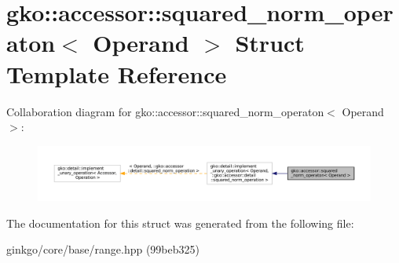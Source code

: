 \hypertarget{structgko_1_1accessor_1_1squared__norm__operaton}{}\section{gko\+:\+:accessor\+:\+:squared\+\_\+norm\+\_\+operaton$<$ Operand $>$ Struct Template Reference}
\label{structgko_1_1accessor_1_1squared__norm__operaton}


Collaboration diagram for gko\+:\+:accessor\+:\+:squared\+\_\+norm\+\_\+operaton$<$ Operand $>$\+:
\nopagebreak
\begin{figure}[H]
\begin{center}
\leavevmode
\includegraphics[width=350pt]{structgko_1_1accessor_1_1squared__norm__operaton__coll__graph}
\end{center}
\end{figure}


The documentation for this struct was generated from the following file\+:\begin{DoxyCompactItemize}
\item 
ginkgo/core/base/range.\+hpp (99beb325)\end{DoxyCompactItemize}
